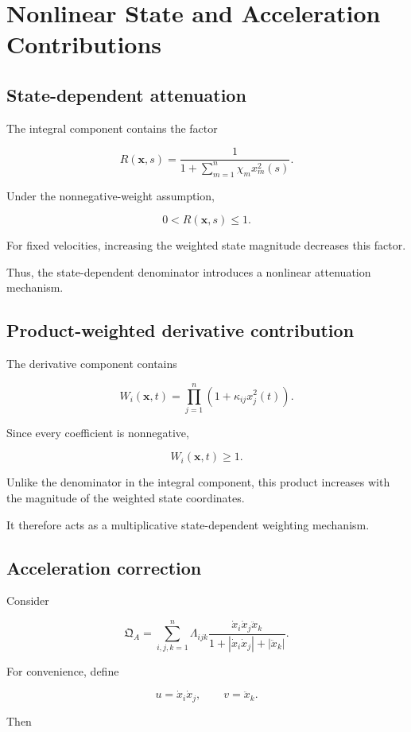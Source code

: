 \documentclass[12pt]{article}
\numberwithin{equation}{section}
\newcommand{\Q}{\mathfrak{Q}}
\theoremstyle{definition}
\theoremstyle{remark}
\begin{document}
\section{Nonlinear State and Acceleration Contributions}

\subsection{State-dependent attenuation}

The integral component contains the factor

\[
R(\mathbf{x},s)
=
\frac{1}
{1+\sum_{m=1}^{n}\chi_mx_m^2(s)}.
\]

Under the nonnegative-weight assumption,

\[
0<R(\mathbf{x},s)\leq1.
\]

For fixed velocities, increasing the weighted
state magnitude decreases this factor.

Thus, the state-dependent denominator
introduces a nonlinear attenuation mechanism.

\subsection{Product-weighted derivative contribution}

The derivative component contains

\[
W_i(\mathbf{x},t)
=
\prod_{j=1}^{n}
(1+\kappa_{ij}x_j^2(t)).
\]

Since every coefficient is nonnegative,

\[
W_i(\mathbf{x},t)\geq1.
\]

Unlike the denominator in the integral
component, this product increases with
the magnitude of the weighted state
coordinates.

It therefore acts as a multiplicative
state-dependent weighting mechanism.

\subsection{Acceleration correction}

Consider

\[
\Q_A
=
\sum_{i,j,k=1}^{n}
\Lambda_{ijk}
\frac{
\dot{x}_i\dot{x}_j\ddot{x}_k
}{
1+
|\dot{x}_i\dot{x}_j|
+
|\ddot{x}_k|
}.
\]

For convenience, define

\[
u=\dot{x}_i\dot{x}_j,
\qquad
v=\ddot{x}_k.
\]

Then
\end{document}
